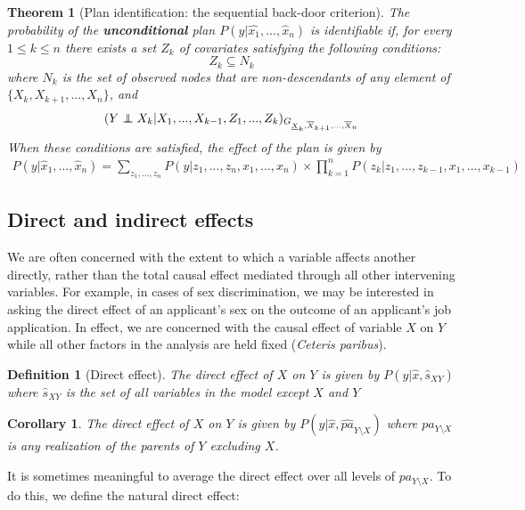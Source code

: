 \documentclass[11pt]{article}
\numberwithin{equation}{section}
\newcommand\indep{\protect\mathpalette{\protect\independenT}{\perp}}
\def\independenT#1#2{\mathrel{\rlap{$#1#2$}\mkern2mu{#1#2}}}
\newtheorem{thm}{Theorem}[section]
\newtheorem{defn}{Definition}[section]
\newtheorem{cor}{Corollary}[section]
\begin{document}
\begin{thm}[Plan identification: the sequential back-door criterion]
The probability of the \textbf{unconditional} plan $P(y|\hat{x_1}, ..., \hat{x}_n)$ is identifiable if, for every $1 \leq k \leq n$ there exists a set $Z_k$ of covariates satisfying the following conditions:
\begin{equation}
Z_k \subseteq N_k
\end{equation}
where $N_k$ is the set of observed nodes that are non-descendants of any element of $\{X_k, X_{k+1},...,X_n\}$, and
\begin{align}
(Y \indep X_k | X_1,...,X_{k-1},Z_1,...,Z_k)_{{G_{\underline{X}_k,\overline{X}_{k+1},...,\overline{X}_{n}}}}
\end{align}
When these conditions are satisfied, the effect of the plan is given by
\begin{align}
P(y|\hat{x}_1,...,\hat{x}_n) = \sum_{z_1,...,z_n} P(y|z_1,...,z_n,x_1,...,x_n) \times \prod_{k=1}^n P(z_k|z_1,...,z_{k-1},x_1,...,x_{k-1})
\end{align}
\end{thm}

\subsection{Direct and indirect effects}

We are often concerned with the extent to which a variable affects another directly, rather than the total causal effect mediated through all other intervening variables. For example, in cases of sex discrimination, we may be interested in asking the direct effect of an applicant's sex on the outcome of an applicant's job application. In effect, we are concerned with the causal effect of variable $X$ on $Y$ while all other factors in the analysis are held fixed (\textit{Ceteris paribus}).

\begin{defn}[Direct effect]
The direct effect of $X$ on $Y$ is given by $P(y|\hat{x},\hat{s}_{XY})$ where $\hat{s}_{XY}$ is the set of all variables in the model except $X$ and $Y$
\end{defn}

\begin{cor}
The direct effect of $X$ on $Y$ is given by $P(y|\hat{x}, \hat{pa}_{Y \setminus X})$ where $pa_{Y \setminus X}$ is any realization of the parents of $Y$ excluding $X$.
\end{cor}

It is sometimes meaningful to average the direct effect over all levels of $pa_{Y\setminus X}$. To do this, we define the natural direct effect:
\end{document}
